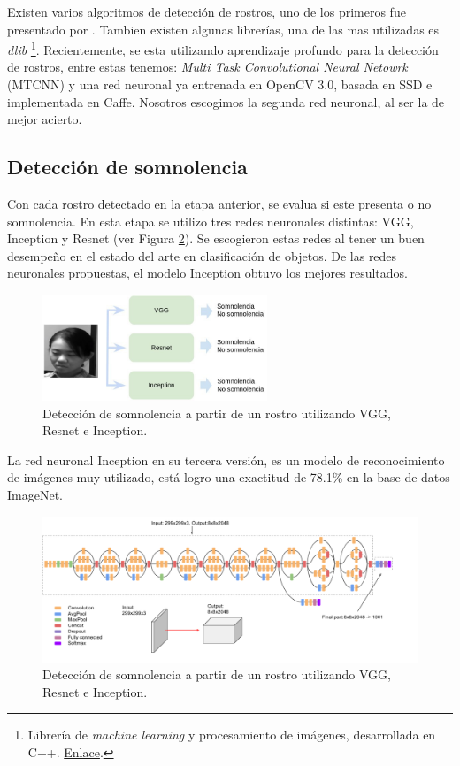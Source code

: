 \documentclass{article}
\begin{document}
	Existen varios algoritmos de detección de rostros, uno de los primeros fue presentado por  \cite{viola2004robust}. Tambien existen algunas librerías, una de las mas utilizadas es \textit{dlib} \footnote{Librería de \textit{machine learning} y procesamiento de imágenes, desarrollada en C++. \href{http://dlib.net/}{Enlace}.}. Recientemente, se esta utilizando aprendizaje profundo para la detección de rostros, entre estas tenemos: \textit{Multi Task Convolutional Neural Netowrk} (MTCNN) \citep{zhang2016joint} y una red neuronal ya entrenada en OpenCV 3.0, basada en SSD e implementada en Caffe. Nosotros escogimos la segunda red neuronal, al ser la de mejor acierto.
	
	\subsection{Detección de somnolencia}
	
	Con cada rostro detectado en la etapa anterior, se evalua si este presenta o no somnolencia. En esta etapa se utilizo tres redes neuronales distintas: VGG, Inception y Resnet (ver Figura \ref{fig:drowsy}). Se escogieron estas redes al tener un buen desempeño en el estado del arte en clasificación de objetos. De las redes neuronales propuestas, el modelo Inception obtuvo los mejores resultados.
	
	\begin{figure}[H]
		\centering
		\includegraphics[width=0.6\textwidth]{img/drowsy}		
		\caption{Detección de somnolencia a partir de un rostro utilizando VGG, Resnet e Inception.}
		\label{fig:drowsy}
	\end{figure}
	
	La red neuronal Inception \cite{szegedy2016rethinking} en su tercera versión, es un modelo de reconocimiento de imágenes muy utilizado, está logro una exactitud de 78.1\% en la base de datos ImageNet. 
	
	\begin{figure}[H]
		\centering
		\includegraphics[width=\textwidth]{img/inception}		
		\caption{Detección de somnolencia a partir de un rostro utilizando VGG, Resnet e Inception.}
		\label{fig:drowsy}
	\end{figure}
	
\end{document}
